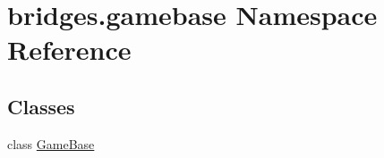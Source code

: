 \hypertarget{namespacebridges_1_1gamebase}{}\section{bridges.\+gamebase Namespace Reference}
\label{namespacebridges_1_1gamebase}
\subsection*{Classes}
\begin{DoxyCompactItemize}
\item 
class \mbox{\hyperlink{classbridges_1_1gamebase_1_1_game_base}{Game\+Base}}
\end{DoxyCompactItemize}
